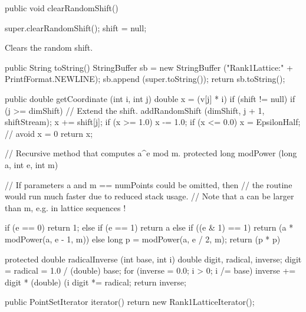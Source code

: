 \begin{htmlonly}
\end{htmlonly}
\begin{code}

   public void clearRandomShift() \begin{hide} {
      super.clearRandomShift();
      shift = null;
   }\end{hide}
\end{code}
\begin{tabb}  Clears the random shift.
\end{tabb}
\begin{code}
 \begin{hide}

   public String toString() {
      StringBuffer sb = new StringBuffer ("Rank1Lattice:" +
                                           PrintfFormat.NEWLINE);
      sb.append (super.toString());
      return sb.toString();
   }


   public double getCoordinate (int i, int j) {
      double x = (v[j] * i) %
      if (shift != null) {
         if (j >= dimShift)   // Extend the shift.
            addRandomShift (dimShift, j + 1, shiftStream);
         x += shift[j];
         if (x >= 1.0)
            x -= 1.0;
         if (x <= 0.0)
            x = EpsilonHalf;  // avoid x = 0
       }
      return x;
   }


   // Recursive method that computes a^e mod m.
   protected long modPower (long a, int e, int m) {
      // If parameters a and m == numPoints could be omitted, then
      // the routine would run much faster due to reduced stack usage.
      // Note that a can be larger than m, e.g. in lattice sequences !

      if (e == 0)
         return 1;
      else if (e == 1)
         return a %
      else if ((e & 1) == 1)
         return (a * modPower(a, e - 1, m)) %
      else {
         long p = modPower(a, e / 2, m);
         return (p * p) %
      }
   }

   protected double radicalInverse (int base, int i) {
      double digit, radical, inverse;
      digit = radical = 1.0 / (double) base;
      for (inverse = 0.0; i > 0; i /= base) {
         inverse += digit * (double) (i %
         digit *= radical;
      }
      return inverse;
   }

   public PointSetIterator iterator() {
      return new Rank1LatticeIterator();
   }


\end{hide}
\end{code}
